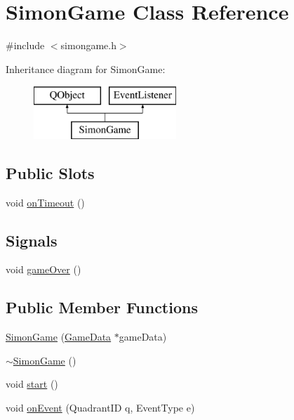 \hypertarget{class_simon_game}{\section{Simon\+Game Class Reference}
\label{class_simon_game}
}


{\ttfamily \#include $<$simongame.\+h$>$}

Inheritance diagram for Simon\+Game\+:\begin{figure}[H]
\begin{center}
\leavevmode
\includegraphics[height=2.000000cm]{class_simon_game}
\end{center}
\end{figure}
\subsection*{Public Slots}
\begin{DoxyCompactItemize}
\item 
void \hyperlink{class_simon_game_a675881171d32be130c1eaba36b7c56d8}{on\+Timeout} ()
\end{DoxyCompactItemize}
\subsection*{Signals}
\begin{DoxyCompactItemize}
\item 
void \hyperlink{class_simon_game_a6d13e176d256c18c5e00d8cac979b239}{game\+Over} ()
\end{DoxyCompactItemize}
\subsection*{Public Member Functions}
\begin{DoxyCompactItemize}
\item 
\hyperlink{class_simon_game_abb9ef25e4158c51128d4b5b9214d0547}{Simon\+Game} (\hyperlink{class_game_data}{Game\+Data} $\ast$game\+Data)
\item 
\hyperlink{class_simon_game_a36ec045acaa79798534b781c554a8df8}{$\sim$\+Simon\+Game} ()
\item 
void \hyperlink{class_simon_game_a3195d192b13c7ee5eba290e4d265427a}{start} ()
\item 
void \hyperlink{class_simon_game_a35dc2ba138666e626ef663ef6b954f4b}{on\+Event} (Quadrant\+I\+D q, Event\+Type e)
\end{DoxyCompactItemize}


